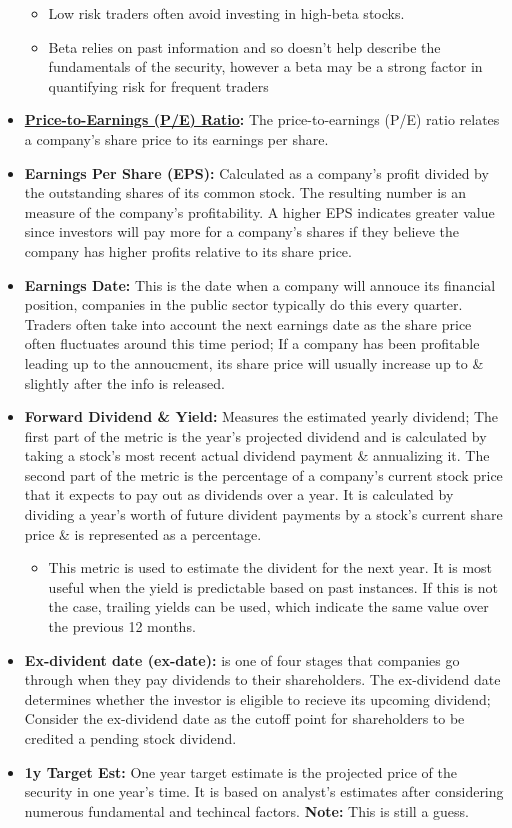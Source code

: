 \documentclass{article}
\begin{document}
\begin{itemize}
\begin{itemize}
				\item Low risk traders often avoid investing in high-beta stocks.
				\item Beta relies on past information and so doesn't help describe the fundamentals of the security, however a beta may be a strong factor in quantifying risk for frequent traders
			\end{itemize}
		\item {\bf \hyperref[sec:PER]{Price-to-Earnings (P/E) Ratio}:} The price-to-earnings (P/E) ratio relates a company's share price to its earnings per share.
		\item {\bf Earnings Per Share (EPS):} Calculated as a company's profit divided by the outstanding shares of its common stock. The resulting number is an measure of the company's profitability. A higher EPS indicates greater value since investors will pay more for a company's shares if they believe the company has higher profits relative to its share price.
		\item {\bf Earnings Date:} This is the date when a company will annouce its financial position, companies in the public sector typically do this every quarter. Traders often take into account the next earnings date as the share price often fluctuates around this time period; If a company has been profitable leading up to the annoucment, its share price will usually increase up to \& slightly after the info is released. 
		\item {\bf Forward Dividend \& Yield:} Measures the estimated yearly dividend; The first part of the metric is the year's projected dividend and is calculated by taking a stock's most recent actual dividend payment \& annualizing it. The second part of the metric is the percentage of a company's current stock price that it expects to pay out as dividends over a year. It is calculated by dividing a year's worth of future divident payments by a stock's current share price \& is represented as a percentage.
			\begin{itemize}
				\item This metric is used to estimate the divident for the next year. It is most useful when the yield is predictable based on past instances. If this is not the case, trailing yields can be used, which indicate the same value over the previous 12 months.
			\end{itemize}
		\item {\bf Ex-divident date (ex-date):} is one of four stages that companies go through when they pay dividends to their shareholders. The ex-dividend date determines whether the investor is eligible to recieve its upcoming dividend; Consider the ex-dividend date as the cutoff point for shareholders to be credited a pending stock dividend.
		\item {\bf 1y Target Est:} One year target estimate is the projected price of the security in one year's time. It is based on analyst's estimates after considering numerous fundamental and techincal factors. {\bf Note:} This is still a guess.
	\end{itemize}
	
\end{document}
